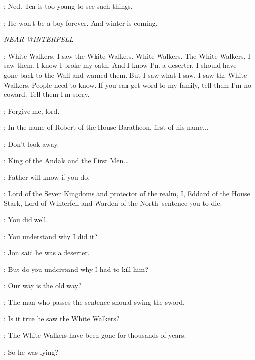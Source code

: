 \CATELYN: Ned. Ten is too young to see such things. 

\NED: He won't be a boy forever. And winter is coming. 


\scene

\textit{NEAR WINTERFELL} 


\WILL: White Walkers. I saw the White Walkers. White Walkers. The White Walkers, I saw them. I know I broke my oath. And I know I'm a deserter. I should have gone back to the Wall and warned them. But I saw what I saw. I saw the White Walkers. People need to know. If you can get word to my family, tell them I'm no coward. Tell them I'm sorry. 


\WILL: Forgive me, lord. 

\NED: In the name of Robert of the House Baratheon, first of his name$\ldots$ 

\JON:  Don't look away. 

\NED: King of the Andals and the First Men$\ldots$ 

\JON: Father will know if you do. 

\NED: Lord of the Seven Kingdoms and protector of the realm, I, Eddard of the House Stark, Lord of Winterfell and Warden of the North, sentence you to die. 


\JON: You did well. 


\NED: You understand why I did it? 

\BRAN: Jon said he was a deserter. 

\NED: But do you understand why I had to kill him? 

\BRAN: Our way is the old way? 

\NED: The man who passes the sentence should swing the sword. 

\BRAN: Is it true he saw the White Walkers? 

\NED: The White Walkers have been gone for thousands of years. 

\BRAN: So he was lying? 

